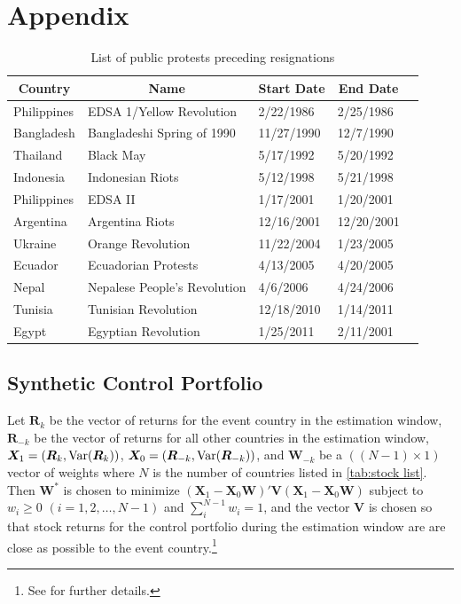 \documentclass[12pt,final,fleqn]{article}
\theoremstyle{plain}
\newcommand\var{{\rm Var}}
\begin{document}
\section{Appendix} \label{Appendix}
\begin{table}[!ht]
\caption{List of public protests preceding resignations} \label{tab:protest-list}
\vspace{-5pt}
\footnotesize
\begin{center}
\begin{threeparttable}
\begin{tabular*}{\textwidth}{l@{\extracolsep{\fill}}llll}
  \hline
    \hline
\multicolumn{1}{c}{Country}&\multicolumn{1}{c}{Name}&\multicolumn{1}{c}{Start Date}&\multicolumn{1}{c}{End Date}\\
  \hline
Philippines & EDSA 1/Yellow Revolution & 2/22/1986 & 2/25/1986\\
Bangladesh & Bangladeshi Spring of 1990 & 11/27/1990 & 12/7/1990\\
Thailand & Black May & 5/17/1992 & 5/20/1992\\
Indonesia & Indonesian Riots & 5/12/1998 & 5/21/1998\\
Philippines & EDSA II & 1/17/2001 & 1/20/2001\\
Argentina & Argentina Riots & 12/16/2001 & 12/20/2001\\
Ukraine & Orange Revolution & 11/22/2004 & 1/23/2005\\
Ecuador & Ecuadorian Protests & 4/13/2005 & 4/20/2005\\
Nepal & Nepalese People's Revolution & 4/6/2006 & 4/24/2006\\
Tunisia & Tunisian Revolution & 12/18/2010 & 1/14/2011\\
Egypt & Egyptian Revolution & 1/25/2011 & 2/11/2001\\
   \hline
   \hline
\end{tabular*}
\scriptsize
\end{threeparttable}
\end{center}
\end{table}

\subsection{Synthetic Control Portfolio}
Let $\boldsymbol{R}_{k}$ be the vector of returns for the event country in the estimation window, $\boldsymbol{R}_{-k}$ be the vector of returns for all other countries in the estimation window, $\boldsymbol{X}_1=(\boldsymbol{R}_{k},\var(\boldsymbol{R}_{k}))$, $\boldsymbol{X}_0=(\boldsymbol{R}_{-k},\var(\boldsymbol{R}_{-k}))$, and $\boldsymbol{W}_{-k}$ be a $((N-1) \times 1)$ vector of weights where $N$ is the number of countries listed in \autoref{tab:stock list}. Then $\boldsymbol{W}^*$ is chosen to minimize $(\boldsymbol{X}_1-\boldsymbol{X}_0\boldsymbol{W})'\boldsymbol{V}(\boldsymbol{X}_1-\boldsymbol{X}_0\boldsymbol{W})$ subject to $w_i\geq0$ $(i = 1,2,\ldots,N-1)$ and $\sum_i^{N-1} w_i = 1$, and the vector $\boldsymbol{V}$ is chosen so that stock returns for the control portfolio during the estimation window are are close as possible to the event country.\footnote{See \citep{abadie2003economic} for further details.}


\end{document}
